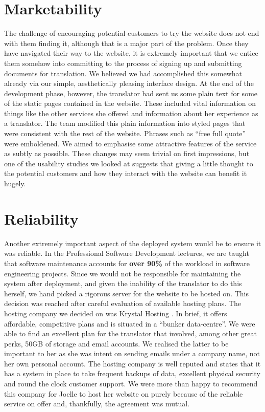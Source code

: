 \documentclass{l3proj}
\begin{document}
\section{Marketability}
The challenge of encouraging potential customers to try the website does not end with them finding it, although 
that is a major part of the problem. Once they have navigated their way to the website, it is extremely important 
that we entice them somehow into committing to the process of signing up and submitting documents for translation.
We believed we had accomplished this somewhat already via our simple, aesthetically pleasing interface design.
At the end of the development phase, however, the translator had sent us some plain text for some of the static 
pages contained in the website. These included vital information on things like the other services she offered
and information about her experience as a translator. The team modified this plain information into styled pages
that were consistent with the rest of the website. Phrases such as ``free full quote'' were emboldened. We 
aimed to emphasise some attractive features of the service as subtly as possible. These changes may seem 
trivial on first impressions, but one of the usability studies we looked at \cite{sixr} suggests that giving a little thought to the potential customers
and how they interact with the website can benefit it hugely.
\section{Reliability}
\label{sec:reliab}
Another extremely important aspect of the deployed system would be to ensure it was reliable. In the 
Professional Software Development lectures, we are taught that {software maintenance} accounts for
\textbf{over 90\%} of the workload in software engineering projects. Since we would not be responsible for 
maintaining the system after deployment, and given the inability of the translator to do this 
herself, we hand picked a rigorous server for the website to be hosted on. This decision was reached after
careful evaluation of available hosting plans. The hosting company we decided on was Krystal Hosting \cite{kry}.
 In brief, it offers affordable, competitive plans and is situated in a 
``bunker data-centre''. We were able to find an excellent plan for the translator that involved, among other
 great perks, 50GB of storage and email accounts.
We realised the latter to be important to her as she was intent on sending emails under a company
name, not her own personal account. The hosting company is well reputed and states that it has a system in place
to take frequent backups of data, excellent physical security and round the clock customer support. We were
more than happy to recommend this company for Joelle to host her website on purely because of the reliable
service on offer and, thankfully, the agreement was mutual.
\end{document}
